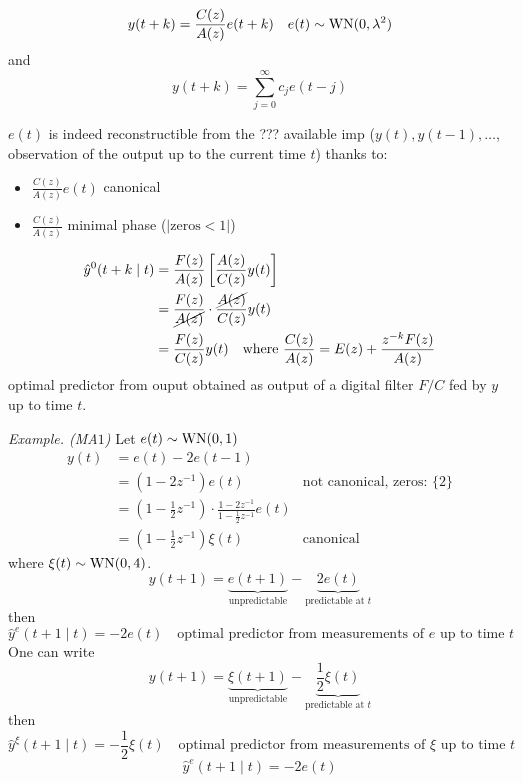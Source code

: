 

\[
	y(t+k)=\frac{C(z)}{A(z)}e(t+k) \quad e(t)\sim\operatorname{WN}(0,\lambda^2 )
\]
and
\[
	y(t+k)=\sum_{j=0}^{\infty} c_{j} e(t-j)
\]



$e(t)$ is indeed reconstructible from the ??? available imp ($y(t), y(t-1),\ldots$, observation of the output up to the current time $t$) thanks to:
\begin{itemize}
	\item $\frac{C(z)}{A(z)}e(t)$ canonical
	\item $\frac{C(z)}{A(z)}$ minimal phase ($|\text{zeros}<1|$)
\end{itemize}


\begin{align*}
	\hat y ^{0}(t+k\mid t)&=\frac{F(z)}{A(z)}\left[ \frac{A(z)}{C(z)}y(t) \right]  \\
	&=\frac{F(z)}{\cancel{A(z)}}\cdot\frac{\cancel{A(z)}}{C(z)}y(t)\\
	&=\frac{F(z)}{C(z)}y(t) \quad \text{where }\frac{C(z)}{A(z)}=E(z)+\frac{z^{-k}F(z) }{A(z)}
\end{align*}
optimal predictor from ouput obtained as output of a digital filter $F/C$ fed by $y$ up to time $t$.

\emph{Example. (MA$1$)}
Let $e(t)\sim \operatorname{WN}(0,1)$
\begin{align*}
	y(t) &= e(t) - 2 e(t-1)\\
	&= (1-2z^{-1} )e(t) &\text{not canonical, zeros: }\{2\}\\
	&=\left( 1-\frac{1}{2} z^{-1}  \right) \cdot\frac{1-2z^{-1}}{1-\frac{1}{2} z^{-1}} e(t)\\
	&=\left( 1-\frac{1}{2} z^{-1}  \right) \xi(t) &\text{canonical}
\end{align*}
where $\xi(t)\sim \operatorname{WN}(0,4)$.
\[
	y(t+1)=\underbrace{e(t+1)}_{\text{unpredictable}}-\underbrace{2e(t)}_{\text{predictable at }t}
\]
then
\[
	\hat y ^{e}(t+1\mid t)=-2e(t) \quad \text{optimal predictor from measurements of $e$ up to time $t$} 
\]
One can write
\[
	y(t+1)=\underbrace{\xi(t+1)}_{\text{unpredictable}}-\underbrace{\frac{1}{2} \xi(t)}_{\text{predictable at }t}
\]
then
\[
	\hat y^{\xi} (t+1\mid t)=-\frac{1}{2} \xi(t) \quad \text{optimal predictor from measurements of $\xi$ up to time $t$} 
\]
\[
	\hat y^{e}(t+1\mid t)=-2e(t) 
\]


